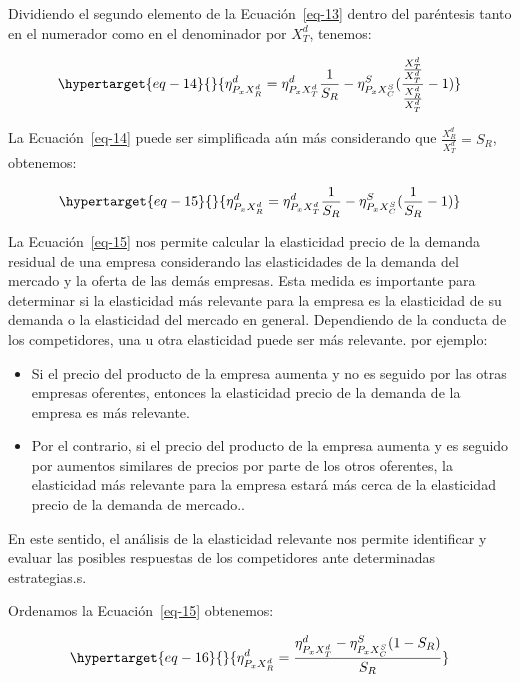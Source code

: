 \documentclass[
  a4paper,
]{article}
\providecommand{\tightlist}{%
  \setlength{\itemsep}{0pt}\setlength{\parskip}{0pt}}\usepackage{longtable,booktabs,array}
\theoremstyle{definition}
\theoremstyle{remark}
\begin{document}
Dividiendo el segundo elemento de la Ecuación~\ref{eq-13} dentro del
paréntesis tanto en el numerador como en el denominador por \(X_T^d\),
tenemos:

\begin{equation}\protect\hypertarget{eq-14}{}{
\eta_{P_{x}X_R^d}^d = \eta_{P_{x}X_T^d}^d \frac{1}{S_R} - \eta_{P_{x}X_C^S}^S (\frac{\frac{X_T^d}{X_T^d}}{\frac{X_R^d}{X_T^d}} - 1)
}\label{eq-14}\end{equation}

La Ecuación~\ref{eq-14} puede ser simplificada aún más considerando que
\(\frac{X_R^d}{X_T^d} = S_R\), obtenemos:

\begin{equation}\protect\hypertarget{eq-15}{}{
\eta_{P_{x}X_R^d}^d = \eta_{P_{x}X_T^d}^d \frac{1}{S_R} - \eta_{P_{x}X_C^S}^S (\frac{1}{S_R} - 1)
}\label{eq-15}\end{equation}

La Ecuación~\ref{eq-15} nos permite calcular la elasticidad precio de la
demanda residual de una empresa considerando las elasticidades de la
demanda del mercado y la oferta de las demás empresas. Esta medida es
importante para determinar si la elasticidad más relevante para la
empresa es la elasticidad de su demanda o la elasticidad del mercado en
general. Dependiendo de la conducta de los competidores, una u otra
elasticidad puede ser más relevante. por ejemplo:

\begin{itemize}
\tightlist
\item
  Si el precio del producto de la empresa aumenta y no es seguido por
  las otras empresas oferentes, entonces la elasticidad precio de la
  demanda de la empresa es más relevante.
\item
  Por el contrario, si el precio del producto de la empresa aumenta y es
  seguido por aumentos similares de precios por parte de los otros
  oferentes, la elasticidad más relevante para la empresa estará más
  cerca de la elasticidad precio de la demanda de mercado..
\end{itemize}

En este sentido, el análisis de la elasticidad relevante nos permite
identificar y evaluar las posibles respuestas de los competidores ante
determinadas estrategias.s.

Ordenamos la Ecuación~\ref{eq-15} obtenemos:

\begin{equation}\protect\hypertarget{eq-16}{}{
\eta_{P_{x}X_R^d}^d = \frac{\eta_{P_{x}X_T^d}^d - \eta_{P_{x}X_C^S}^{S} (1-S_R)}{S_R}
}\label{eq-16}\end{equation}
\end{document}
